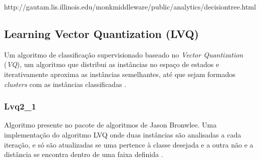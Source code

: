 http://gautam.lis.illinois.edu/monkmiddleware/public/analytics/decisiontree.html

\fi

\subsection{Learning Vector Quantization (LVQ)}

Um algoritmo de classificação supervisionado baseado no \emph{Vector Quantization} (\emph{VQ}), um algoritmo que distribui as instâncias no espaço de estados e iterativamente aproxima as instâncias semelhantes, até que sejam formados \emph{clusters} com as instâncias classificadas \cite{Kohonen1997}.

\subsubsection{Lvq2\_1}

Algoritmo presente no pacote de algoritmos de Jason Bronwlee. Uma implementação do algoritmo LVQ onde duas instâncias são analisadas a cada iteração, e só são atualizadas se uma pertence à classe desejada e a outra não e a distância se encontra dentro de uma faixa definida \cite{Brownlee2011w}.

